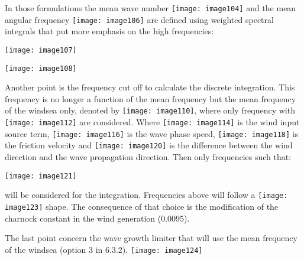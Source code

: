  In those formulations the mean wave number \texttt{[image: image104]} and the mean angular frequency \texttt{[image: image106]} are defined using weighted spectral integrals that put more emphasis on the high frequencies:

 \texttt{[image: image107]}

 \texttt{[image: image108]}

 Another point is the frequency cut off to calculate the discrete integration. This frequency is no longer a function of the mean frequency but the mean frequency of the windsea only, denoted by \texttt{[image: image110]}, where only frequency with \texttt{[image: image112]}  are considered. Where \texttt{[image: image114]} is the wind input source term, \texttt{[image: image116]} is the wave phase speed, \texttt{[image: image118]} is the friction velocity and \texttt{[image: image120]} is the difference between the wind direction and the wave propagation direction. Then only frequencies such that:

 \texttt{[image: image121]}

 will be considered for the integration. Frequencies above will follow a \texttt{[image: image123]} shape. The consequence of that choice is the modification of the charnock constant in the wind generation (0.0095).

 The last point concern the wave growth limiter that will use the mean frequency of the windsea (option 3 in 6.3.2).  \texttt{[image: image124]}

